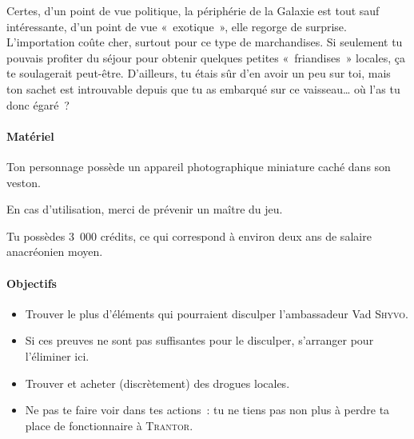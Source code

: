 {Certes, d’un point de vue politique, la périphérie de la Galaxie est tout sauf intéressante, d’un point de vue «~exotique~», elle regorge de surprise.
L’importation coûte cher, surtout pour ce type de marchandises.
Si seulement tu pouvais profiter du séjour pour obtenir quelques petites «~friandises~» locales, ça te soulagerait peut-être.
D’ailleurs, tu étais sûr d’en avoir un peu sur toi, mais ton sachet est introuvable depuis que tu as embarqué sur ce vaisseau… où l’as tu donc égaré~?

\paragraph{Matériel}
{
Ton personnage possède un appareil photographique miniature caché dans son veston.

En cas d’utilisation, merci de prévenir un maître du jeu.

Tu possèdes 3~000 crédits, ce qui correspond à environ deux ans de salaire anacréonien moyen.
}

\paragraph{Objectifs}{
\begin{itemize}
	\item Trouver le plus d’éléments qui pourraient disculper l’ambassadeur Vad \textsc{Shyvo}.
	\item Si ces preuves ne sont pas suffisantes pour le disculper, s’arranger pour l’éliminer ici.
	\item Trouver et acheter (discrètement) des drogues locales.
	\item Ne pas te faire voir dans tes actions~:  tu ne tiens pas non plus à perdre ta place de fonctionnaire à \textsc{Trantor}.
\end{itemize}
}
}

